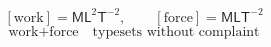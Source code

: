 \[ [\text{work}] = \mathsf{M}\mathsf{L}^{2}\mathsf{T}^{-2}, \qquad [\text{force}] = \mathsf{M}\mathsf{L}\mathsf{T}^{-2} \]
\[ \text{work} + \text{force} \quad \text{typesets without complaint} \]

